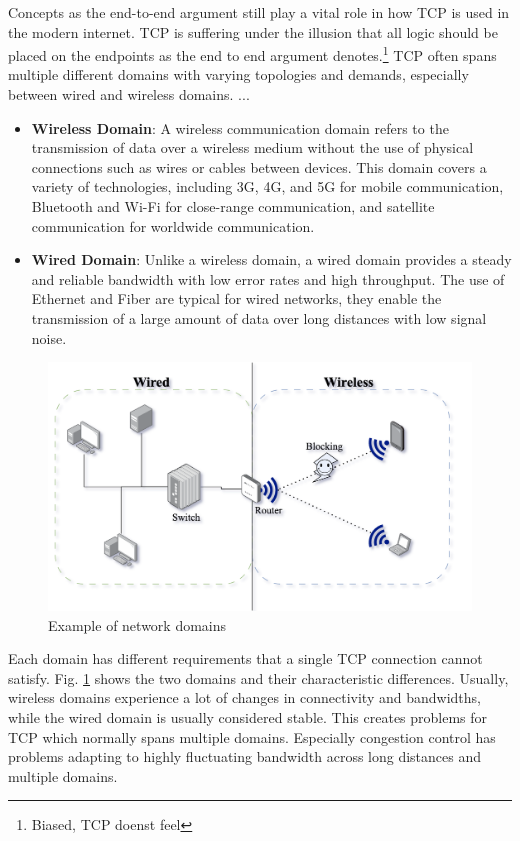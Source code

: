 \documentclass[a4paper,english, 11pt]{report}
\begin{document}
Concepts as the end-to-end argument still play a vital role in how TCP is used in the modern internet. TCP is suffering under the illusion that all logic should be placed on the endpoints as the end to end argument denotes.\footnote{Biased, TCP doenst feel} TCP often spans multiple different domains with varying topologies and demands, especially between wired and wireless domains. ...
\begin{itemize}
  \item \textbf{Wireless Domain}: A wireless communication domain refers to the transmission of data over a wireless medium without the use of physical connections such as wires or cables between devices. This domain covers a variety of technologies, including 3G, 4G, and 5G for mobile communication, Bluetooth and Wi-Fi for close-range communication, and satellite communication for worldwide communication.
  \item \textbf{Wired Domain}: Unlike a wireless domain, a wired domain provides a steady and reliable bandwidth with low error rates and high throughput. The use of Ethernet and Fiber are typical for wired networks, they enable the transmission of a large amount of data over long distances with low signal noise. 
\end{itemize}

\begin{figure}[h] %
	\centering
	\includegraphics[scale=0.65]{../diagrams/drawio/domains.png}
  	\caption{Example of network domains}
  	\label{fig:domains}
\end{figure}

Each domain has different requirements that a single TCP connection cannot satisfy. Fig. \ref{fig:domains} shows the two domains and their characteristic differences. Usually, wireless domains experience a lot of changes in connectivity and bandwidths, while the wired domain is usually considered stable. This creates problems for TCP which normally spans multiple domains. Especially congestion control has problems adapting to highly fluctuating bandwidth across long distances and multiple domains. 
\end{document}
